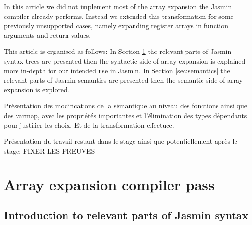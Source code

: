 \documentclass{article}
\begin{document}
\smallskip

In this article we did not implement most of the array expansion the Jasmin
compiler already performs. Instead we extended this transformation for some
previously unsupported cases, namely expanding register arrays in function
arguments and return values. 

\medskip

This article is organised as follows:
In Section \ref{sec:syntax} the relevant parts of Jasmin syntax trees are
presented then the syntactic side of array expansion is explained more in-depth
for our intended use in Jasmin.
In Section \ref{sec:semantics} the relevant parts of Jasmin semantics are
presented then the semantic side of array expansion is explored.

 Présentation des modifications de la sémantique au niveau des fonctions ainsi
 que des varmap, avec les propriétés importantes et l'élimination des types
 dépendants pour justifier les choix. Et de la transformation effectuée.

 Présentation du travail restant dans le stage ainsi que potentiellement après
 le stage: FIXER LES PREUVES


\section{Array expansion compiler pass}\label{sec:syntax}

\subsection{Introduction to relevant parts of Jasmin syntax}
\end{document}
